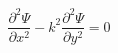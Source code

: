    \begin{center}
        \begin{equation*}
            \frac{\partial^{2}\Psi}{\partial x^{2}} -
            k^{2}\frac{\partial^{2}\Psi}{\partial y^{2}} = 0
        \end{equation*}
    \end{center}
